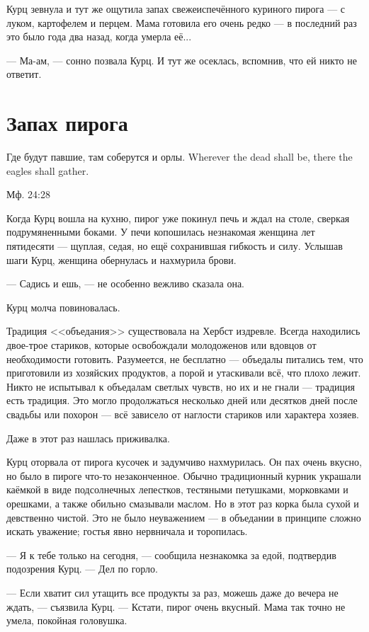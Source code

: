 Курц зевнула и тут же ощутила запах свежеиспечённого куриного пирога --- с луком, картофелем и перцем.
Мама готовила его очень редко --- в последний раз это было года два назад, когда умерла её...

--- Ма-ам, --- сонно позвала Курц.
И тут же осеклась, вспомнив, что ей никто не ответит.

\section{Запах пирога}

\epigraph
{
{Где будут павшие, там соберутся и орлы.}
{Wherever the dead shall be, there the eagles shall gather.}
}{Мф. 24:28}

Когда Курц вошла на кухню, пирог уже покинул печь и ждал на столе, сверкая подрумяненными боками.
У печи копошилась незнакомая женщина лет пятидесяти --- щуплая, седая, но ещё сохранившая гибкость и силу.
Услышав шаги Курц, женщина обернулась и нахмурила брови.

--- Садись и ешь, --- не особенно вежливо сказала она.

Курц молча повиновалась.

Традиция <<объедания>> существовала на Хербст издревле.
Всегда находились двое-трое стариков, которые освобождали молодоженов или вдовцов от необходимости готовить.
Разумеется, не бесплатно --- объедалы питались тем, что приготовили из хозяйских продуктов, а порой и утаскивали всё, что плохо лежит.
Никто не испытывал к объедалам светлых чувств, но их и не гнали --- традиция есть традиция.
Это могло продолжаться несколько дней или десятков дней после свадьбы или похорон --- всё зависело от наглости стариков или характера хозяев.

Даже в этот раз нашлась приживалка.

Курц оторвала от пирога кусочек и задумчиво нахмурилась.
Он пах очень вкусно, но было в пироге что-то незаконченное.
Обычно традиционный курник украшали каёмкой в виде подсолнечных лепестков, тестяными петушками, морковками и орешками, а также обильно смазывали маслом.
Но в этот раз корка была сухой и девственно чистой.
Это не было неуважением --- в объедании в принципе сложно искать уважение;
гостья явно нервничала и торопилась.

--- Я к тебе только на сегодня, --- сообщила незнакомка за едой, подтвердив подозрения Курц.
--- Дел по горло.

--- Если хватит сил утащить все продукты за раз, можешь даже до вечера не ждать, --- съязвила Курц.
--- Кстати, пирог очень вкусный.
Мама так точно не умела, покойная головушка.

